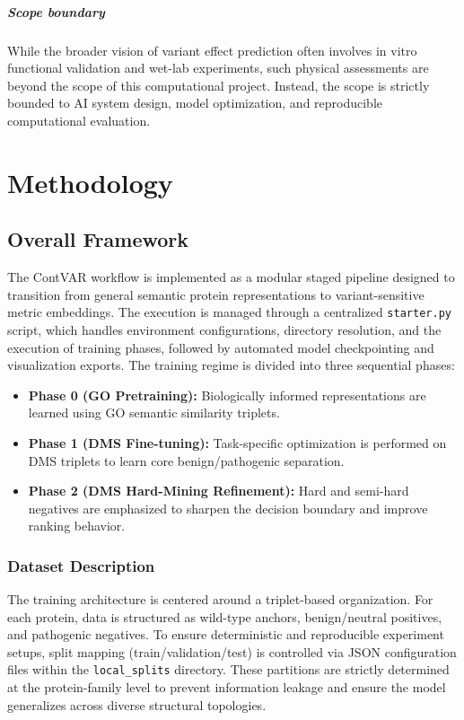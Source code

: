 \documentclass[unnumsec,webpdf,contemporary,large]{oup-authoring-template}%
\theoremstyle{thmstyleone}%
\theoremstyle{thmstyletwo}%
\theoremstyle{thmstylethree}%
\begin{document}
\subparagraph{Scope boundary}
While the broader vision of variant effect prediction often involves in vitro functional validation and wet-lab experiments, such physical assessments are beyond the scope of this computational project. Instead, the scope is strictly bounded to AI system design, model optimization, and reproducible computational evaluation.

\section{Methodology}\label{sec3}

\subsection{Overall Framework}\label{subsec2}
The ContVAR workflow is implemented as a modular staged pipeline designed to transition from general semantic protein representations to variant-sensitive metric embeddings. The execution is managed through a centralized \texttt{starter.py} script, which handles environment configurations, directory resolution, and the execution of training phases, followed by automated model checkpointing and visualization exports. The training regime is divided into three sequential phases:
\begin{itemize}
    \item \textbf{Phase 0 (GO Pretraining):} Biologically informed representations are learned using GO semantic similarity triplets.
    \item \textbf{Phase 1 (DMS Fine-tuning):} Task-specific optimization is performed on DMS triplets to learn core benign/pathogenic separation.
    \item \textbf{Phase 2 (DMS Hard-Mining Refinement):} Hard and semi-hard negatives are emphasized to sharpen the decision boundary and improve ranking behavior.
\end{itemize}

\subsubsection{Dataset Description}\label{subsubsec2}
The training architecture is centered around a triplet-based organization. For each protein, data is structured as wild-type anchors, benign/neutral positives, and pathogenic negatives. To ensure deterministic and reproducible experiment setups, split mapping (train/validation/test) is controlled via JSON configuration files within the \texttt{local\_splits} directory. These partitions are strictly determined at the protein-family level to prevent information leakage and ensure the model generalizes across diverse structural topologies.
\end{document}
